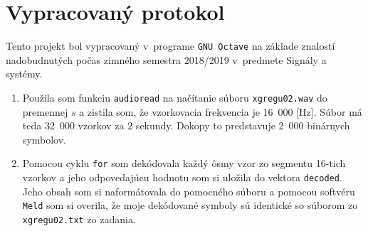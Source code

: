 \documentclass[10pt, a4paper, twocolumn]{article}
\begin{document}
\section*{Vypracovaný protokol}
Tento projekt bol vypracovaný v~programe \texttt{GNU Octave} na základe znalostí nadobudnutých počas zimného semestra 2018/2019 v~predmete Signály a systémy.

\begin{enumerate}[leftmargin=*]
\item Použila som funkciu \texttt{audioread} na načítanie súboru \texttt{xgregu02.wav} do premennej $s$ a zistila som, že vzorkovacia frekvencia je 16~000 [Hz]. Súbor má teda 32~000 vzorkov za 2 sekundy. Dokopy to predstavuje 2~000 binárnych symbolov.

\item Pomocou cyklu \texttt{for} som dekódovala každý ôsmy vzor zo segmentu 16-tich vzorkov a jeho odpovedajúcu hodnotu som si uložila do vektora \texttt{decoded}. Jeho obsah som si naformátovala do pomocného súboru a pomocou softvéru \texttt{Meld} som si overila, že moje dekódované symboly sú identické so súborom zo \texttt{xgregu02.txt} zo zadania.

\begin{figure}[H]
\centering
{}
\end{figure}


\end{enumerate}
\end{document}
